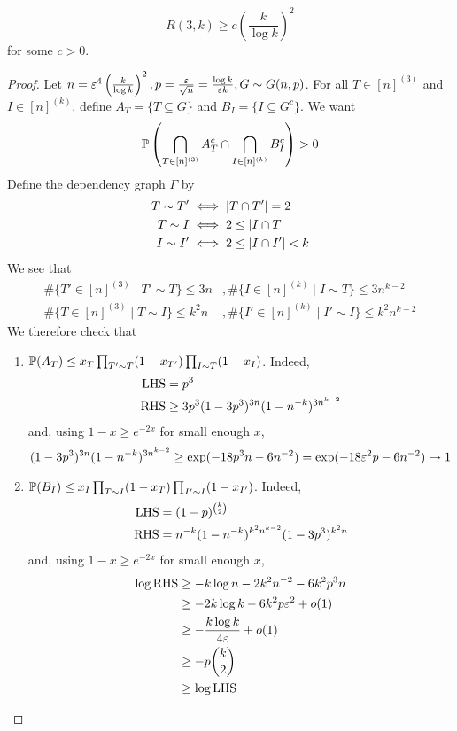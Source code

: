 \documentclass{article}
\begin{document}
\begin{thm}[Erd\H os, 1961]
  $$R(3, k) \ge c\left(\frac k{\log k}\right)^2$$
  for some $c > 0$.
\end{thm}
\begin{proof}
  Let $n = \eps^4\left(\frac k{\log k}\right)^2, p = \frac\eps{\sqrt n} = \frac{\log k}{\eps k}, G \sim G(n, p)$. For all $T \in [n]^{(3)}$ and $I \in [n]^{(k)}$, define $A_T = \{T \subseteq G\}$ and $B_I = \{I \subseteq G^c\}$. We want
  $$\P\left(\Inter_{T \in [n]^{(3)}} A_T^c \inter \Inter_{I \in [n]^{(k)}} B_I^c\right) > 0$$
  Define the dependency graph $\Gamma$ by
  \begin{align*}
    T \sim T' & \iff \abs{T \inter T'} = 2 \\
    T \sim I & \iff 2 \le \abs{I \inter T} \\
    I \sim I' & \iff 2 \le \abs{I \inter I'} < k
  \end{align*}
  We see that
  \begin{align*}
    \#\{T' \in [n]^{(3)} \mid T' \sim T\} \le 3n & , \#\{I \in [n]^{(k)} \mid I \sim T\} \le 3n^{k - 2} \\
    \#\{T \in [n]^{(3)} \mid T \sim I\} \le k^2n & , \#\{I' \in [n]^{(k)} \mid I' \sim I\} \le k^2n^{k - 2}
  \end{align*}
  We therefore check that
  \begin{enumerate}
    \item $\P(A_T) \le x_T \prod_{T' \sim T} (1 - x_{T'}) \prod_{I \sim T} (1 - x_I)$. Indeed,
      \begin{align*}
        \lhs & = p^3 \\
        \rhs & \ge 3p^3 (1 - 3p^3)^{3n}(1 - n^{-k})^{3n^{k - 2}}
      \end{align*}
      and, using $1 - x \ge e^{-2x}$ for small enough $x$,
      $$(1 - 3p^3)^{3n}(1 - n^{-k})^{3n^{k - 2}} \ge \exp(-18p^3n - 6n^{-2}) = \exp(-18\eps^2 p - 6n^{-2}) \to 1$$

\newlec

    \item $\P(B_I) \le x_I \prod_{T \sim I}(1 - x_T) \prod_{I' \sim I} (1 - x_{I'})$. Indeed,
      \begin{align*}
        \lhs & = (1 - p)^{\binom k2} \\
        \rhs & = n^{-k}(1 - n^{-k})^{k^2n^{k - 2}}(1 - 3p^3)^{k^2n}
      \end{align*}
      and, using $1 - x \ge e^{-2x}$ for small enough $x$,
      \begin{align*}
        \log\rhs
        & \ge -k\log n - 2k^2n^{-2} - 6k^2p^3n \\
        & \ge -2k\log k - 6k^2p\eps^2 + o(1) \\
        & \ge -\frac{k\log k}{4\eps} + o(1) \\
        & \ge -p\binom k2 \\
        & \ge \log\lhs
      \end{align*}
  \end{enumerate}
\end{proof}
\end{document}
